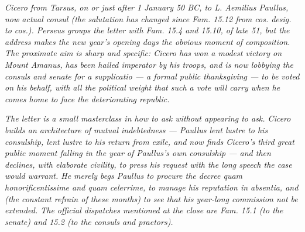 
\textit{Cicero from Tarsus, on or just after 1 January 50 BC, to L.
Aemilius Paullus, now actual consul (the salutation has changed since
\textit{Fam.} 15.12 from \textit{cos. desig.} to \textit{cos.}).
Perseus groups the letter with \textit{Fam.} 15.4 and 15.10, of late
51, but the address makes the new year's opening days the obvious
moment of composition. The proximate aim is sharp and specific:
Cicero has won a modest victory on Mount Amanus, has been hailed
\textit{imperator} by his troops, and is now lobbying the consuls and
senate for a \textit{supplicatio} --- a formal public thanksgiving ---
to be voted on his behalf, with all the political weight that such a
vote will carry when he comes home to face the deteriorating
republic.}

\textit{The letter is a small masterclass in how to ask without
appearing to ask. Cicero builds an architecture of mutual indebtedness
--- Paullus lent lustre to his consulship, lent lustre to his return
from exile, and now finds Cicero's third great public moment falling
in the year of Paullus's own consulship --- and then declines, with
elaborate civility, to press his request with the long speech the
case would warrant. He merely begs Paullus to procure the decree
\textit{quam honorificentissime} and \textit{quam celerrime}, to
manage his reputation in absentia, and (the constant refrain of these
months) to see that his year-long commission not be extended. The
official dispatches mentioned at the close are \textit{Fam.} 15.1
(to the senate) and 15.2 (to the consuls and praetors).}

